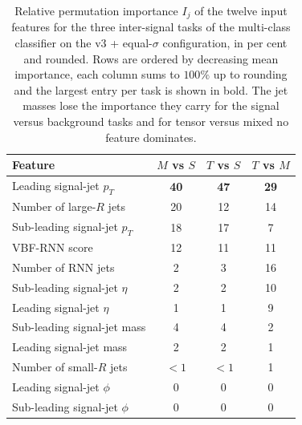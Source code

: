 \begin{table}[htbp]
  \centering
  \caption{Relative permutation importance $I_j$ of the twelve input features for the three inter-signal tasks of the multi-class classifier on the v3 + equal-$\sigma$ configuration, in per cent and rounded. Rows are ordered by decreasing mean importance, each column sums to $100\%$ up to rounding and the largest entry per task is shown in bold. The jet masses lose the importance they carry for the signal versus background tasks and for tensor versus mixed no feature dominates.}
  \label{tab:fr_rank_mc_sig}
  \begin{tabular}{|l|c|c|c|}
    \hline
    \textbf{Feature} & \textbf{$M$ vs $S$} & \textbf{$T$ vs $S$} & \textbf{$T$ vs $M$} \\
    \hline
    Leading signal-jet $p_T$      & \textbf{40} & \textbf{47} & \textbf{29} \\
    Number of large-$R$ jets      & 20 & 12 & 14 \\
    Sub-leading signal-jet $p_T$  & 18 & 17 & 7 \\
    VBF-RNN score                 & 12 & 11 & 11 \\
    Number of RNN jets            & 2  & 3  & 16 \\
    Sub-leading signal-jet $\eta$ & 2  & 2  & 10 \\
    Leading signal-jet $\eta$     & 1  & 1  & 9 \\
    Sub-leading signal-jet mass   & 4  & 4  & 2 \\
    Leading signal-jet mass       & 2  & 2  & 1 \\
    Number of small-$R$ jets      & $<1$ & $<1$ & 1 \\
    Leading signal-jet $\phi$     & 0  & 0  & 0 \\
    Sub-leading signal-jet $\phi$ & 0  & 0  & 0 \\
    \hline
  \end{tabular}
\end{table}

